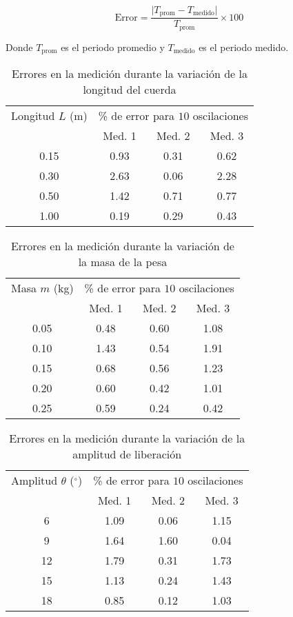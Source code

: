\documentclass[letterpaper]{report}
\numberwithin{table}{section}
\begin{document}
\begin{equation}
  \text{Error} = \frac{\lvert T_{\text{prom}} -
  T_{\text{medido}} \rvert}{T_{\text{prom}}} \times 100
\end{equation}

Donde $T_{\text{prom}}$ es el periodo promedio y $T_{\text{medido}}$ es
el periodo medido.

\begin{table}[ht]
  \centering
  \begin{tabular}{cccc}
    \toprule
    Longitud $L$ (m) & \multicolumn{3}{c}{\% de error para $10$
    oscilaciones} \\
    \cmidrule(lr){2-4}
    & Med. 1 & Med. 2 & Med. 3  \\
    \midrule
    0.15 & 0.93 & 0.31 & 0.62 \\
    0.30 & 2.63 & 0.06 & 2.28 \\
    0.50 & 1.42 & 0.71 & 0.77 \\
    1.00 & 0.19 & 0.29 & 0.43 \\
    \bottomrule
  \end{tabular}
  \caption{Errores en la medición durante la variación de la
  longitud del cuerda}\label{tab:error_longitud}
\end{table}

\begin{table}[ht]
  \centering
  \begin{tabular}{cccc}
    \toprule
    Masa $m$ (kg) & \multicolumn{3}{c}{\% de error para $10$
    oscilaciones} \\
    \cmidrule(lr){2-4}
    & Med. 1 & Med. 2 & Med. 3  \\
    \midrule
    0.05 & 0.48 & 0.60 & 1.08 \\
    0.10 & 1.43 & 0.54 & 1.91 \\
    0.15 & 0.68 & 0.56 & 1.23 \\
    0.20 & 0.60 & 0.42 & 1.01 \\
    0.25 & 0.59 & 0.24 & 0.42 \\
    \bottomrule
  \end{tabular}
  \caption{Errores en la medición durante la variación de la
  masa de la pesa}\label{tab:error_masa}
\end{table}

\begin{table}[ht]
  \centering
  \begin{tabular}{cccc}
    \toprule
    Amplitud $\theta$ ($^{\circ}$) & \multicolumn{3}{c}{\% de
      error para $10$
    oscilaciones} \\
    \cmidrule(lr){2-4}
    & Med. 1 & Med. 2 & Med. 3  \\
    \midrule
    6  & 1.09 & 0.06 & 1.15 \\
    9  & 1.64 & 1.60 & 0.04 \\
    12 & 1.79 & 0.31 & 1.73 \\
    15 & 1.13 & 0.24 & 1.43 \\
    18 & 0.85 & 0.12 & 1.03 \\
    \bottomrule
  \end{tabular}
  \caption{Errores en la medición durante la variación de la
  amplitud de liberación}\label{tab:error_amplitud}
\end{table}
\end{document}
